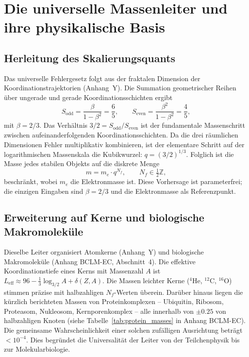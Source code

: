 \documentclass[11pt,a4paper]{article}
\begin{document}
	\section{Die universelle Massenleiter und ihre physikalische Basis}
	
	\subsection{Herleitung des Skalierungsquants}
	
	Das universelle Fehlergesetz folgt aus der fraktalen Dimension der Koordinationstrajektorien (Anhang~Y). Die Summation geometrischer Reihen über ungerade und gerade Koordinationsschichten ergibt
	\[
	S_{\mathrm{odd}} = \frac{\beta}{1-\beta^2} = \frac{6}{5}, \qquad
	S_{\mathrm{even}} = \frac{\beta^2}{1-\beta^2} = \frac{4}{5},
	\]
	mit \(\beta = 2/3\). Das Verhältnis \(3/2 = S_{\mathrm{odd}}/S_{\mathrm{even}}\) ist der fundamentale Massenschritt zwischen aufeinanderfolgenden Koordinationsschichten. Da die drei räumlichen Dimensionen Fehler multiplikativ kombinieren, ist der elementare Schritt auf der logarithmischen Massenskala die Kubikwurzel: \(q = (3/2)^{1/3}\). Folglich ist die Masse jedes stabilen Objekts auf die diskrete Menge
	\begin{equation}
		m = m_e \cdot q^{N_f}, \qquad N_f \in \tfrac12\mathbb{Z},
		\label{eq:quantization}
	\end{equation}
	beschränkt, wobei \(m_e\) die Elektronmasse ist. Diese Vorhersage ist parameterfrei; die einzigen Eingaben sind \(\beta = 2/3\) und die Elektronmasse als Referenzpunkt.
	
	\subsection{Erweiterung auf Kerne und biologische Makromoleküle}
	
	Dieselbe Leiter organisiert Atomkerne (Anhang~Y) und biologische Makromoleküle (Anhang BCLM-EC, Abschnitt~4). Die effektive Koordinationstiefe eines Kerns mit Massenzahl \(A\) ist \(L_{\mathrm{eff}} \approx 96 - \frac13 \log_{3/2} A + \delta(Z,A)\). Die Massen leichter Kerne (\(^4\)He, \(^{12}\)C, \(^{16}\)O) stimmen präzise mit halbzahligen \(N_f\)-Werten überein. Darüber hinaus liegen die kürzlich berichteten Massen von Proteinkomplexen – Ubiquitin, Ribosom, Proteasom, Nukleosom, Kernporenkomplex – alle innerhalb von \(\pm 0.25\) von halbzahligen Knoten (siehe Tabelle~\ref{tab:protein_masses} in Anhang BCLM-EC). Die gemeinsame Wahrscheinlichkeit einer solchen zufälligen Ausrichtung beträgt \(< 10^{-4}\). Dies begründet die Universalität der Leiter von der Teilchenphysik bis zur Molekularbiologie.
	
\end{document}
